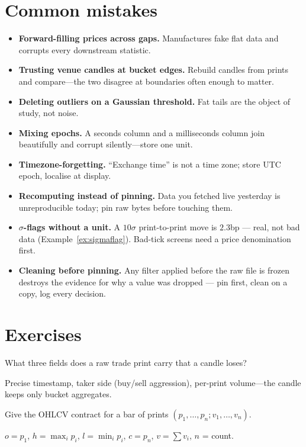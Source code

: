 \section{Common mistakes}
\begin{itemize}
\item \textbf{Forward-filling prices across gaps.} Manufactures fake flat data and corrupts
  every downstream statistic.
\item \textbf{Trusting venue candles at bucket edges.} Rebuild candles from prints and
  compare---the two disagree at boundaries often enough to matter.
\item \textbf{Deleting outliers on a Gaussian threshold.} Fat tails are the object of study,
  not noise.
\item \textbf{Mixing epochs.} A seconds column and a milliseconds column join beautifully
  and corrupt silently---store one unit.
\item \textbf{Timezone-forgetting.} ``Exchange time'' is not a time zone; store UTC epoch,
  localise at display.
\item \textbf{Recomputing instead of pinning.} Data you fetched live yesterday is
  unreproducible today; pin raw bytes before touching them.
\item \textbf{$\sigma$-flags without a unit.} A $10\sigma$
print-to-print move is $2.3$bp --- real, not bad data
(Example~\ref{ex:sigmaflag}). Bad-tick screens need a price
denomination first.
\item \textbf{Cleaning before pinning.} Any filter applied before
the raw file is frozen destroys the evidence for why a value was
dropped --- pin first, clean on a copy, log every decision.\end{itemize}

\section{Exercises}
\begin{exercise}[easy]
What three fields does a raw trade print carry that a candle loses?
\end{exercise}
\begin{solution}
Precise timestamp, taker side (buy/sell aggression), per-print volume---the candle keeps only
bucket aggregates.
\end{solution}

\begin{exercise}[easy]
Give the OHLCV contract for a bar of prints
$(p_1,\dots,p_n;v_1,\dots,v_n)$.
\end{exercise}
\begin{solution}
$o=p_1$, $h=\max_i p_i$, $l=\min_i p_i$, $c=p_n$, $v=\sum v_i$, $n$ = count.
\end{solution}

